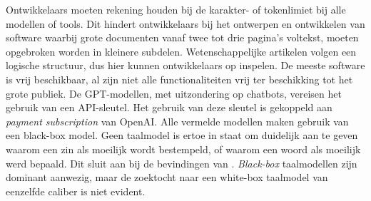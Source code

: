 \begin{table}[H]
	\centering
\end{table}

Ontwikkelaars moeten rekening houden bij de karakter- of tokenlimiet bij alle modellen of tools. Dit hindert ontwikkelaars bij het ontwerpen en ontwikkelen van software waarbij grote documenten vanaf twee tot drie pagina's voltekst, moeten opgebroken worden in kleinere subdelen. Wetenschappelijke artikelen volgen een logische structuur, dus hier kunnen ontwikkelaars op inspelen. De meeste software is vrij beschikbaar, al zijn niet alle functionaliteiten vrij ter beschikking tot het grote publiek. De GPT-modellen, met uitzondering op chatbots, vereisen het gebruik van een API-sleutel. Het gebruik van deze sleutel is gekoppeld aan \textit{payment subscription} van OpenAI. Alle vermelde modellen maken gebruik van een black-box model. Geen taalmodel is ertoe in staat om duidelijk aan te geven waarom een zin als moeilijk wordt bestempeld, of waarom een woord als moeilijk werd bepaald. Dit sluit aan bij de bevindingen van \textcite{Gooding2022}. \textit{Black-box} taalmodellen zijn dominant aanwezig, maar de zoektocht naar een white-box taalmodel van eenzelfde caliber is niet evident.

